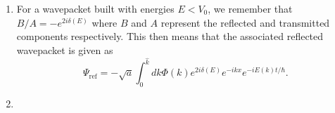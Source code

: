 \begin{sol}
\begin{enumerate}[label = (\alph*)]
    \item For a wavepacket built with energies $E < V_0$, we remember that $B/A = -e^{2i\delta(E)}$ where $B$ and $A$ represent the reflected and transmitted components respectively. This then means that the associated reflected wavepacket is given as 
    \[\Psi_{\text{ref}} = -\sqrt{a} \int_{0}^{\hat{k}} dk \Phi (k) e^{2i \delta (E)} e^{-ikx}e^{-i E(k)t/\hbar}.\]
    
    \item 
\end{enumerate}
\end{sol}